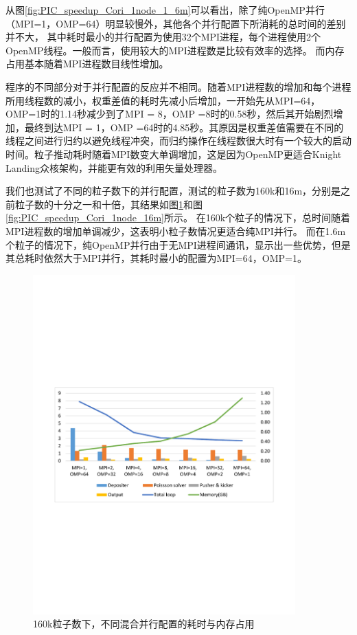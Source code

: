 从图\ref{fig:PIC_speedup_Cori_1node_1_6m}可以看出，除了纯OpenMP并行（MPI=1，OMP=64）明显较慢外，其他各个并行配置下所消耗的总时间的差别并不大，
其中耗时最小的并行配置为使用32个MPI进程，每个进程使用2个OpenMP线程。一般而言，使用较大的MPI进程数是比较有效率的选择。
而内存占用基本随着MPI进程数目线性增加。



程序的不同部分对于并行配置的反应并不相同。随着MPI进程数的增加和每个进程所用线程数的减小，权重差值的耗时先减小后增加，一开始先从MPI=64，OMP=1时的1.14秒减少到了MPI = 8，OMP =8时的0.58秒，然后其开始剧烈增加，最终到达MPI = 1，OMP =64时的4.85秒。其原因是权重差值需要在不同的线程之间进行归约以避免线程冲突，而归约操作在线程数很大时有一个较大的启动时间。粒子推动耗时随着MPI数变大单调增加，这是因为OpenMP更适合Knight Landing众核架构，并能更有效的利用矢量处理器。

我们也测试了不同的粒子数下的并行配置，测试的粒子数为160k和16m，分别是之前粒子数的十分之一和十倍，其结果如图\ref{fig:PIC_speedup_Cori_1node_160k}和图\ref{fig:PIC_speedup_Cori_1node_16m}所示。
在160k个粒子的情况下，总时间随着MPI进程数的增加单调减少，这表明小粒子数情况更适合纯MPI并行。
而在1.6m个粒子的情况下，纯OpenMP并行由于无MPI进程间通讯，显示出一些优势，但是其总耗时依然大于MPI并行，其耗时最小的配置为MPI=64，OMP=1。

\begin{figure}[!htb]
  \centering
  \includegraphics[width=0.9\textwidth]{Img/PIC_speedup_Cori_1node_160k.pdf}
  \caption{160k粒子数下，不同混合并行配置的耗时与内存占用}
  \label{fig:PIC_speedup_Cori_1node_160k}
\end{figure}

